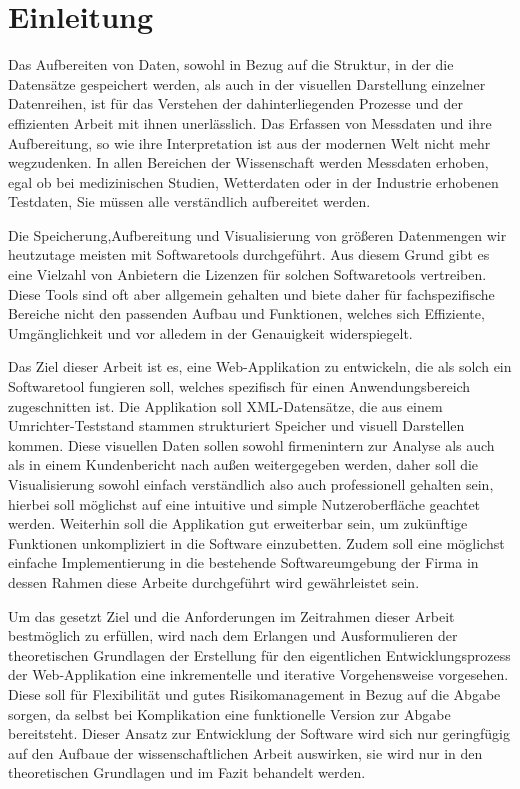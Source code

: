 


\newpage
\section{Einleitung}
\label{sec:einleitung}
Das Aufbereiten von Daten, sowohl in Bezug auf die Struktur, in der die Datensätze gespeichert werden,
als auch in der visuellen Darstellung einzelner Datenreihen, ist für das
Verstehen der dahinterliegenden Prozesse und der effizienten Arbeit mit ihnen unerlässlich.
Das Erfassen von Messdaten und ihre Aufbereitung, so wie ihre Interpretation
ist aus der modernen Welt nicht mehr wegzudenken.
In allen Bereichen der Wissenschaft werden Messdaten erhoben, egal ob bei medizinischen Studien,
Wetterdaten oder in der Industrie erhobenen Testdaten, Sie müssen alle
verständlich aufbereitet werden.

Die Speicherung,Aufbereitung und Visualisierung von größeren Datenmengen wir heutzutage meisten mit Softwaretools durchgeführt.
Aus diesem Grund gibt es eine Vielzahl von Anbietern die
Lizenzen für solchen Softwaretools vertreiben.
Diese Tools sind oft aber allgemein gehalten und biete daher für fachspezifische Bereiche nicht den
passenden Aufbau und Funktionen, welches sich Effiziente, Umgänglichkeit und
vor alledem in der Genauigkeit widerspiegelt.

Das Ziel dieser Arbeit ist es, eine Web-Applikation zu entwickeln, die als solch ein Softwaretool
fungieren soll, welches spezifisch für einen Anwendungsbereich zugeschnitten ist.
Die Applikation soll XML-Datensätze, die aus einem Umrichter-Teststand
stammen strukturiert Speicher und visuell Darstellen kommen.
Diese visuellen Daten sollen sowohl firmenintern zur Analyse als auch als in einem
Kundenbericht nach außen weitergegeben werden, daher soll die Visualisierung sowohl
einfach verständlich also auch professionell gehalten sein, hierbei soll
möglichst auf eine intuitive und simple Nutzeroberfläche geachtet werden.
Weiterhin soll die Applikation gut erweiterbar sein, um zukünftige Funktionen
unkompliziert in die Software einzubetten.
Zudem soll eine möglichst einfache Implementierung in die bestehende Softwareumgebung der Firma in dessen Rahmen
diese Arbeite durchgeführt wird gewährleistet sein.

Um das gesetzt Ziel und die Anforderungen im Zeitrahmen dieser Arbeit bestmöglich zu erfüllen, wird nach
dem Erlangen und Ausformulieren der theoretischen Grundlagen der Erstellung für
den eigentlichen Entwicklungsprozess der Web-Applikation eine inkrementelle und
iterative Vorgehensweise vorgesehen.
Diese soll für Flexibilität und gutes Risikomanagement in Bezug auf die Abgabe sorgen, da selbst bei Komplikation
eine funktionelle Version zur Abgabe bereitsteht.
Dieser Ansatz zur Entwicklung der Software wird sich nur geringfügig auf den Aufbaue der
wissenschaftlichen Arbeit auswirken, sie wird nur in den theoretischen
Grundlagen und im Fazit behandelt werden.


